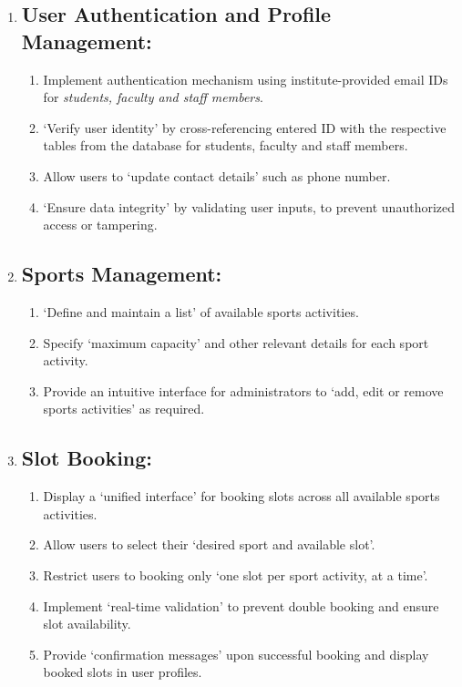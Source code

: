 \documentclass[12pt]{article}
\begin{document}
\begin{enumerate}
    
    \item[] \subsection{User Authentication and Profile Management:}
    \begin{enumerate}[label=\alph*)]
        \item Implement authentication mechanism using institute-provided email IDs for \textit{students, faculty and staff members}.
        \item `Verify user identity' by cross-referencing entered ID with the respective tables from the database for students, faculty and staff members.
        \item Allow users to `update contact details' such as phone number.
        \item `Ensure data integrity' by validating user inputs, to prevent unauthorized access or tampering.
    \end{enumerate}

    \vspace{0.4cm}

    \item[] \subsection{Sports Management:}
    \begin{enumerate}[label=\alph*)]
        \item `Define and maintain a list' of available sports activities.
        \item Specify `maximum capacity' and other relevant details for each sport activity.
        \item Provide an intuitive interface for administrators to `add, edit or remove sports activities' as required.
    \end{enumerate}

    \vspace{0.4cm}

    \item[] \subsection{Slot Booking:}
    \begin{enumerate}[label=\alph*)]
        \item Display a `unified interface' for booking slots across all available sports activities.
        \item Allow users to select their `desired sport and available slot'.
        \item Restrict users to booking only `one slot per sport activity, at a time'.
        \item Implement `real-time validation' to prevent double booking and ensure slot availability.
        \item Provide `confirmation messages' upon successful booking and display booked slots in user profiles.
    \end{enumerate}


\end{enumerate}
\end{document}
